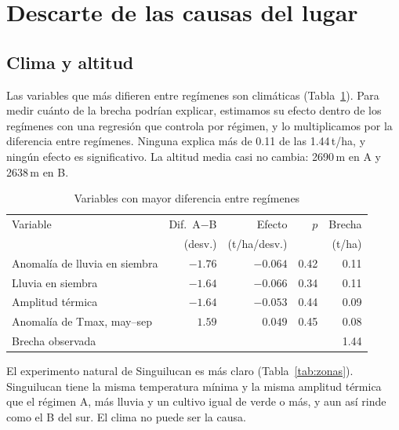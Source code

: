 \section{Descarte de las causas del lugar}\label{sec:descarte}

\subsection{Clima y altitud}\label{sec:clima}

Las variables que más difieren entre regímenes son climáticas (Tabla~\ref{tab:clima}). Para medir cuánto de la brecha
podrían explicar, estimamos su efecto dentro de los regímenes con una regresión que controla por régimen, y lo
multiplicamos por la diferencia entre regímenes. Ninguna explica más de 0.11 de las 1.44\,t/ha, y ningún efecto es
significativo. La altitud media casi no cambia: 2690\,m en A y 2638\,m en B.

\begin{table}[t]
\centering
\caption{Variables con mayor diferencia entre regímenes}
\label{tab:clima}
\footnotesize
\begin{tabular}{@{}lrrrr@{}}
\toprule
Variable & Dif.\ A$-$B & Efecto & $p$ & Brecha \\
 & (desv.) & (t/ha/desv.) & & (t/ha) \\
\midrule
Anomalía de lluvia en siembra & $-1.76$ & $-0.064$ & 0.42 & 0.11 \\
Lluvia en siembra & $-1.64$ & $-0.066$ & 0.34 & 0.11 \\
Amplitud térmica & $-1.64$ & $-0.053$ & 0.44 & 0.09 \\
Anomalía de Tmax, may--sep & $1.59$ & $0.049$ & 0.45 & 0.08 \\
\midrule
Brecha observada & & & & 1.44 \\
\bottomrule
\end{tabular}
\end{table}

El experimento natural de Singuilucan es más claro (Tabla~\ref{tab:zonas}). Singuilucan tiene la misma temperatura
mínima y la misma amplitud térmica que el régimen A, más lluvia y un cultivo igual de verde o más, y aun así rinde
como el B del sur. El clima no puede ser la causa.

